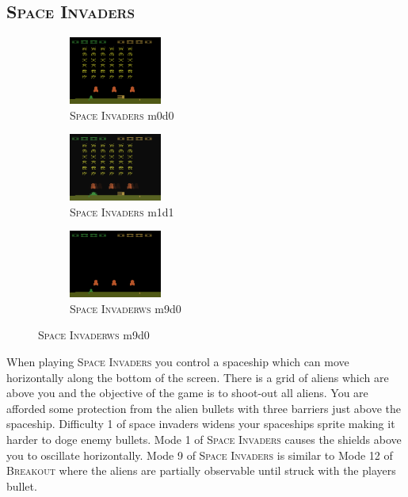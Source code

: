 \documentclass{article}
\begin{document}
\subsection*{\textsc{Space Invaders}}
\begin{figure}[h]
    \begin{subfigure}{0.32\linewidth}
    \centering
    \includegraphics[width=1.2in]{figures/alemodes/space_invaders_m0.png}
    \caption{\textsc{Space Invaders} m0d0}
    \end{subfigure}
    \begin{subfigure}{0.32\linewidth}
    \centering
    \includegraphics[width=1.2in]{figures/alemodes/space_invaders_m1.png}
    \caption{\textsc{Space Invaders} m1d1}
    \end{subfigure}
    \begin{subfigure}{0.32\linewidth}
    \centering
    \includegraphics[width=1.2in]{figures/alemodes/space_invaders_m9.png}
    \caption{\textsc{Space Invaderws} m9d0}
    \end{subfigure}
\end{figure}
When playing \textsc{Space Invaders} you control a spaceship which can move horizontally along the bottom of the screen. There is a grid of aliens which are above you and the objective of the game is to shoot-out all aliens. You are afforded some protection from the alien bullets with three barriers just above the spaceship. Difficulty 1 of space invaders widens your spaceships sprite making it harder to doge enemy bullets. Mode 1 of \textsc{Space Invaders} causes the shields above you to oscillate horizontally. Mode 9 of \textsc{Space Invaders} is similar to Mode 12 of \textsc{Breakout} where the aliens are partially observable until struck with the players bullet.
\end{document}
